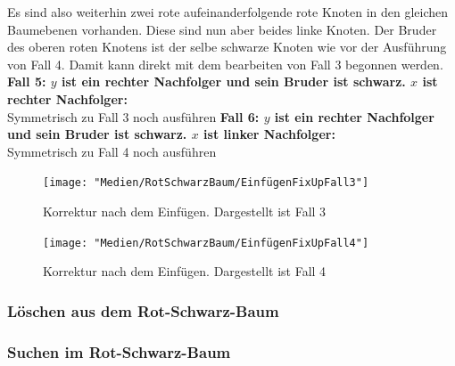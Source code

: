 \documentclass[a4paper,12pt]{article}
\begin{document}
\noindent Es sind also weiterhin zwei rote aufeinanderfolgende rote Knoten in den gleichen Baumebenen vorhanden. Diese sind nun aber beides linke Knoten. Der Bruder des oberen roten Knotens ist der selbe schwarze Knoten wie vor der Ausführung von Fall 4. Damit kann direkt mit dem bearbeiten von Fall 3 begonnen werden.\\

\noindent\textbf{Fall 5: $y$ ist ein rechter Nachfolger und sein Bruder ist schwarz. $x$ ist rechter Nachfolger: }\\ 
	Symmetrisch zu Fall 3
	noch ausführen
\noindent\textbf{Fall 6: $y$ ist ein rechter Nachfolger und sein Bruder ist schwarz. $x$ ist linker Nachfolger: }\\ 
Symmetrisch zu Fall 4
noch ausführen


\begin{figure}[h]
	\centering
	\texttt{[image: "Medien/RotSchwarzBaum/EinfügenFixUpFall3"]}
	\caption{Korrektur nach dem Einfügen. Dargestellt ist Fall 3  }
	\label{fig:EinfügenFixUpFall3}
\end{figure}

\begin{figure}[h]
	\centering
	\texttt{[image: "Medien/RotSchwarzBaum/EinfügenFixUpFall4"]}
	\caption{Korrektur nach dem Einfügen. Dargestellt ist Fall 4  }
	\label{fig:EinfügenFixUpFall4}
\end{figure}


   
\subsubsection{Löschen aus dem Rot-Schwarz-Baum}

\subsubsection{Suchen im Rot-Schwarz-Baum}
\end{document}
